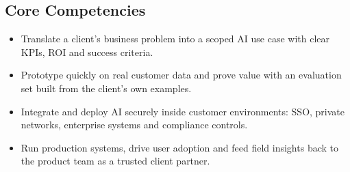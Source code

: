 \documentclass[10pt,a4paper]{article}
\begin{document}
\subsection*{Core Competencies}\begin{itemize}\small
\item Translate a client's business problem into a scoped AI use case with clear KPIs, ROI and success criteria.
\item Prototype quickly on real customer data and prove value with an evaluation set built from the client's own examples.
\item Integrate and deploy AI securely inside customer environments: SSO, private networks, enterprise systems and compliance controls.
\item Run production systems, drive user adoption and feed field insights back to the product team as a trusted client partner.
\end{itemize}
\end{document}
